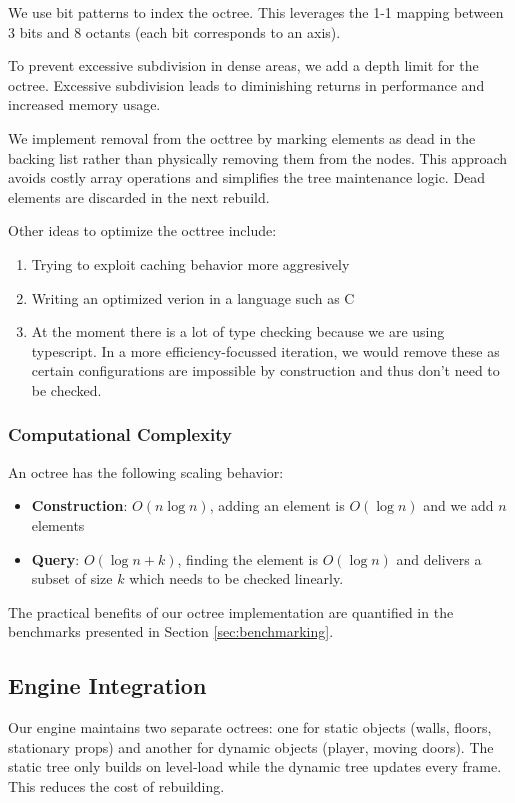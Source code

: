\documentclass{article}
\begin{document}
We use bit patterns to index the octree. This leverages the 1-1 mapping between
3 bits and 8 octants (each bit corresponds to an axis).

To prevent excessive subdivision in dense areas, we add a depth limit for the
octree. Excessive subdivision leads to diminishing returns in performance and
increased memory usage.

We implement removal from the octtree by marking elements as dead in the
backing list rather than physically removing them from the nodes. This approach
avoids costly array operations and simplifies the tree maintenance logic. Dead
elements are discarded in the next rebuild.

Other ideas to optimize the octtree include:
\begin{enumerate}
	\item Trying to exploit caching behavior more aggresively
	\item Writing an optimized verion in a language such as C
	\item At the moment there is a lot of type checking because we are
		using typescript. In a more efficiency-focussed iteration, we would
		remove these as certain configurations are impossible by
		construction and thus don't need to be checked.

\end{enumerate}

\subsubsection{Computational Complexity}
An octree has the following scaling behavior:
\begin{itemize}
	\item \textbf{Construction}: $O(n \log n)$, adding an element is
		$O(\log n)$ and we add $n$  elements

	\item \textbf{Query}: $O(\log n + k)$, finding the element is $O(\log n)$
		and delivers a subset of size $k$ which needs to be checked linearly.
\end{itemize}

The practical benefits of our octree implementation are quantified in the
benchmarks presented in Section \ref{sec:benchmarking}.


\subsection{Engine Integration}
Our engine maintains two separate octrees: one for static objects (walls,
floors, stationary props) and another for dynamic objects (player, moving
doors). The static tree only builds on level-load while the dynamic tree
updates every frame. This reduces the cost of rebuilding.
\end{document}

